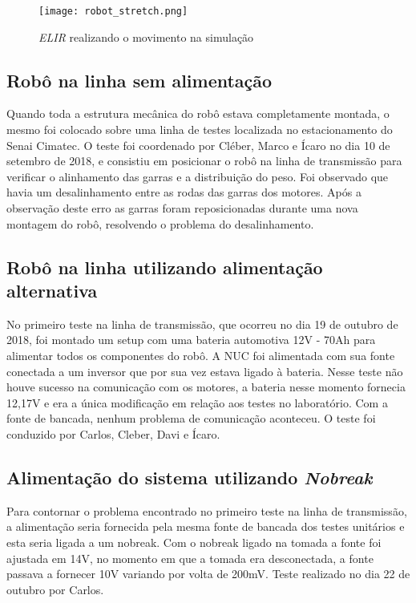 \begin{figure}[h!]												
	\centering												
	\texttt{[image: robot\_stretch.png]}				
	\caption{\textit{ELIR} realizando o movimento na simulação}		
	\label{img:robot_stretch}
\end{figure}
  
\subsection{Robô na linha sem alimentação}
Quando toda a estrutura mecânica do robô estava completamente montada, o mesmo foi colocado sobre uma linha de testes localizada no estacionamento do Senai  Cimatec. O teste foi coordenado por Cléber, Marco e Ícaro no dia 10 de setembro de 2018, e consistiu em posicionar o robô na linha de transmissão para verificar o alinhamento das garras e a distribuição do peso. Foi observado que havia um desalinhamento entre as rodas das garras dos motores. Após a observação deste erro as garras foram reposicionadas durante uma nova montagem do robô, resolvendo o problema do desalinhamento.

\subsection{Robô na linha utilizando alimentação alternativa}
No primeiro teste na linha de transmissão, que ocorreu no dia 19 de outubro de 2018, foi montado um setup com uma bateria automotiva 12V - 70Ah para alimentar todos os componentes do robô. A NUC foi alimentada com sua fonte conectada a um inversor que por sua vez estava ligado à bateria. Nesse teste não houve sucesso na comunicação com os motores, a bateria nesse momento fornecia 12,17V e era a única modificação em relação aos testes no laboratório. Com a fonte de bancada, nenhum problema de comunicação aconteceu. O teste foi conduzido por Carlos, Cleber, Davi e Ícaro.

\subsection{Alimentação do sistema utilizando \textit{Nobreak}}
Para contornar o problema encontrado no primeiro teste na linha de transmissão, a alimentação seria fornecida pela mesma fonte de bancada dos testes unitários e esta seria ligada a um nobreak. Com o nobreak ligado na tomada a fonte foi ajustada em 14V, no momento em que a tomada era desconectada, a fonte passava a fornecer 10V variando por volta de 200mV. Teste realizado no dia 22 de outubro por Carlos.

